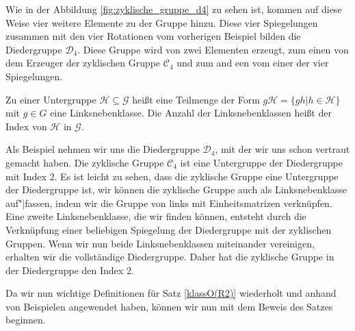 Wie in der Abbildung \ref{fig:zyklische_gruppe_d4} zu sehen ist, kommen auf diese Weise vier weitere Elemente zu der Gruppe hinzu. Diese vier Spiegelungen zusammen mit den vier Rotationen vom vorherigen Beispiel bilden die Diedergruppe $\mathcal{D}_4$. Diese Gruppe wird von zwei Elementen erzeugt, zum einen von dem Erzeuger der zyklischen Gruppe $\mathcal{C}_4$ und zum and een vom einer der vier Spiegelungen. 
\begin{defi}[Linksnebenklasse]
	Zu einer Untergruppe $\mathcal{H} \subseteq \mathcal{G}$ heißt eine Teilmenge der Form $g\mathcal{H} = \{gh|h\in\mathcal{H}\}$ mit $g \in G$ eine Linksnebenklasse. Die Anzahl der Linksnebenklassen heißt der Index von $\mathcal{H}$ in $\mathcal{G}$.
\end{defi}
Als Beispiel nehmen wir uns die Diedergruppe $\mathcal{D}_4$, mit der wir uns schon vertraut gemacht haben. Die zyklische Gruppe $\mathcal{C}_4$ ist eine Untergruppe der Diedergruppe mit Index 2. Es ist leicht zu sehen, dass die zyklische Gruppe eine Untergruppe der Diedergruppe ist, wir können die zyklische Gruppe auch als Linksnebenklasse auf"|fassen, indem wir die Gruppe von links mit Einheitsmatrizen verknüpfen. Eine zweite Linksnebenklasse, die wir finden können, entsteht durch die Verknüpfung einer beliebigen Spiegelung der Diedergruppe mit der zyklischen Gruppen. Wenn wir nun beide Linksnebenklassen miteinander vereinigen, erhalten wir die vollständige Diedergruppe. Daher hat die zyklische Gruppe in der Diedergruppe den Index 2. \par\smallskip
Da wir nun wichtige Definitionen für Satz \ref{klassO(R2)} wiederholt und anhand von Beispielen angewendet haben, können wir nun mit dem Beweis des Satzes beginnen.
